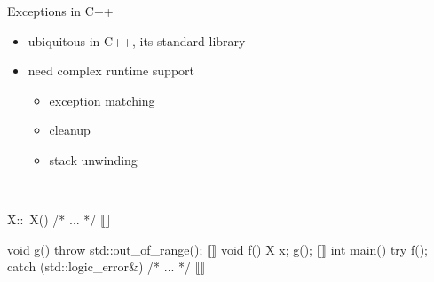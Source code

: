 \documentclass[aspectratio=169, fi]{paradise-slide}
\begin{document}
\newcommand{\arr}[1]{\visible<#1>{\textcolor{red}{$\mathbf{\longleftarrow}$}}}
\begin{frame}[fragile]{Exceptions in C++}
  \begin{minipage}{0.47\textwidth}
    \setlength{\leftmargini}{1em}
    \begin{itemize}
      \item ubiquitous in C++, its standard library
      \item need complex runtime support
        \begin{itemize}
          \item exception matching
          \item cleanup
          \item stack unwinding
        \end{itemize}
    \end{itemize}

    \bigskip
    \medskip\\
  \end{minipage}
  \hfill
  \pause
  \begin{minipage}{0.47\textwidth}
    \begin{cppcodeln}
      X::~X() { /* ... */ } ⟦\arr{4}⟧

      void g() {
        throw std::out_of_range(); ⟦\arr{2}⟧
      }
      void f() {
        X x;
        g();
      } ⟦\arr{3}⟧
      int main() {
        try {
          f();
        } catch (std::logic_error&) {
          /* ... */ ⟦\arr{5}⟧
        }
      }
    \end{cppcodeln}
  \end{minipage}
\end{frame}
\end{document}
